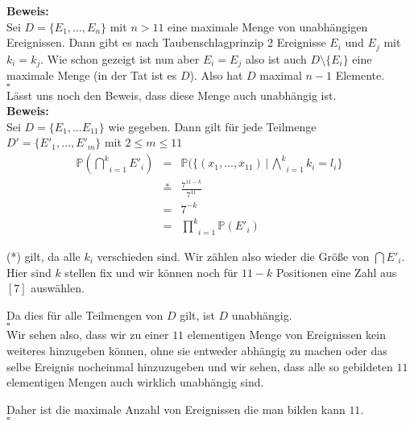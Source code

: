 \documentclass[11pt,a4paper,ngerman]{article}
\newcommand{\Prob}{\mathbb{P}}
\begin{document}
\textbf{Beweis:}\\
Sei $D = \{E_1, \ldots, E_{n} \}$ mit $n>11$ eine maximale Menge von unabhängigen Ereignissen. Dann gibt es nach Taubenschlagprinzip 2 Ereignisse $E_i$ und $E_j$ mit
$k_i = k_j$. Wie schon gezeigt ist nun aber $E_i = E_j$ also ist auch $D \setminus \{ E_i \}$ eine maximale Menge (in der Tat ist es $D$).
Also hat $D$ maximal $n-1$ Elemente.\\
\mbox{}\hfill$\square$\\

Lässt uns noch den Beweis, dass diese Menge auch unabhängig ist.\\
\textbf{Beweis:}\\
Sei $D = \{E_1, \ldots E_{11}\}$ wie gegeben. Dann gilt für jede Teilmenge $D' = \{E'_1, \ldots, E'_m\}$ mit $2\leq m \leq 11$
\[
    \begin{array}{rcl}
        \Prob(\underset{i=1}{\overset{k}{\bigcap}} E'_i) &=& \Prob(\{ (x_1, \ldots, x_{11}) \, | \, \underset{i=1}{\overset{k}{\bigwedge}} k_i = l_i\}\\
            &\stackrel{*}{=}& \frac{7^{11-k}}{7^11}\\
            &=& 7^{-k}\\
            &=& \underset{i=1}{\overset{k}{\prod}} \Prob(E'_i)
    \end{array}
\]

(*) gilt, da alle $k_i$ verschieden sind. Wir zählen also wieder die Größe von $\bigcap E'_i$. Hier sind $k$ stellen fix und wir können noch
für $11-k$ Positionen eine Zahl aus $[7]$ auswählen.

Da dies für alle Teilmengen von $D$ gilt, ist $D$ unabhängig.\\
\mbox{}\hfill$\square$\\


Wir sehen also, dass wir zu einer $11$ elementigen Menge von Ereignissen kein weiteres hinzugeben können, ohne sie entweder abhängig zu machen oder
das selbe Ereignis nocheinmal hinzuzugeben und wir sehen, dass alle so gebildeten $11$ elementigen Mengen auch wirklich unabhängig sind.

Daher ist die maximale Anzahl von Ereignissen die man bilden kann $11$.\\
\mbox{}\hfill$\square$

\label{LastPage}
\end{document}
